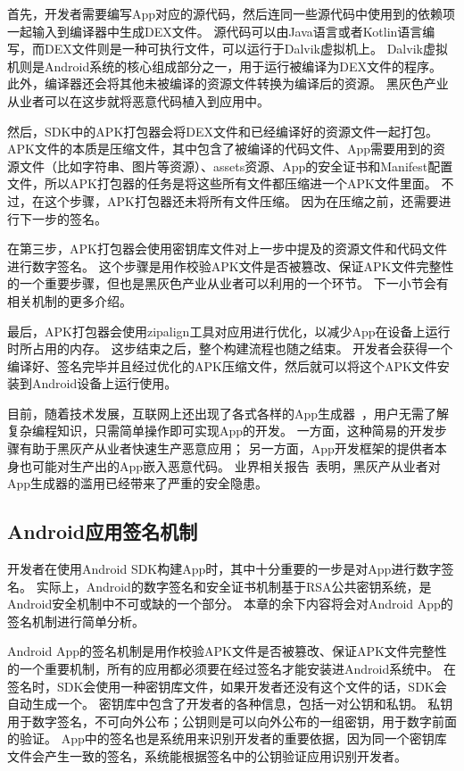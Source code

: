 首先，开发者需要编写App对应的源代码，然后连同一些源代码中使用到的依赖项一起输入到编译器中生成DEX文件。
源代码可以由Java语言或者Kotlin语言编写，而DEX文件则是一种可执行文件，可以运行于Dalvik虚拟机上。
Dalvik虚拟机则是Android系统的核心组成部分之一，用于运行被编译为DEX文件的程序。
此外，编译器还会将其他未被编译的资源文件转换为编译后的资源。
黑灰色产业从业者可以在这步就将恶意代码植入到应用中。

然后，SDK中的APK打包器会将DEX文件和已经编译好的资源文件一起打包。
APK文件的本质是压缩文件，其中包含了被编译的代码文件、App需要用到的资源文件（比如字符串、图片等资源）、assets资源、App的安全证书和Manifest配置文件，所以APK打包器的任务是将这些所有文件都压缩进一个APK文件里面。
不过，在这个步骤，APK打包器还未将所有文件压缩。
因为在压缩之前，还需要进行下一步的签名。

在第三步，APK打包器会使用密钥库文件对上一步中提及的资源文件和代码文件进行数字签名。
这个步骤是用作校验APK文件是否被篡改、保证APK文件完整性的一个重要步骤，但也是黑灰色产业从业者可以利用的一个环节。
下一小节会有相关机制的更多介绍。

最后，APK打包器会使用zipalign工具对应用进行优化，以减少App在设备上运行时所占用的内存。
这步结束之后，整个构建流程也随之结束。
开发者会获得一个编译好、签名完毕并且经过优化的APK压缩文件，然后就可以将这个APK文件安装到Android设备上运行使用。

目前，随着技术发展，互联网上还出现了各式各样的App生成器~\cite{anjian, iApp}，用户无需了解复杂编程知识，只需简单操作即可实现App的开发。
一方面，这种简易的开发步骤有助于黑灰产从业者快速生产恶意应用；
另一方面，App开发框架的提供者本身也可能对生产出的App嵌入恶意代码。
业界相关报告~\cite{anquanke_framework}表明，黑灰产从业者对App生成器的滥用已经带来了严重的安全隐患。

\subsection{Android应用签名机制}
\label{sec:signature}

开发者在使用Android SDK构建App时，其中十分重要的一步是对App进行数字签名。
实际上，Android的数字签名和安全证书机制基于RSA公共密钥系统，是Android安全机制中不可或缺的一个部分。
本章的余下内容将会对Android App的签名机制进行简单分析。

Android App的签名机制是用作校验APK文件是否被篡改、保证APK文件完整性的一个重要机制，所有的应用都必须要在经过签名才能安装进Android系统中。
在签名时，SDK会使用一种密钥库文件，如果开发者还没有这个文件的话，SDK会自动生成一个。
密钥库中包含了开发者的各种信息，包括一对公钥和私钥。
私钥用于数字签名，不可向外公布；公钥则是可以向外公布的一组密钥，用于数字前面的验证。
App中的签名也是系统用来识别开发者的重要依据，因为同一个密钥库文件会产生一致的签名，系统能根据签名中的公钥验证应用识别开发者。

